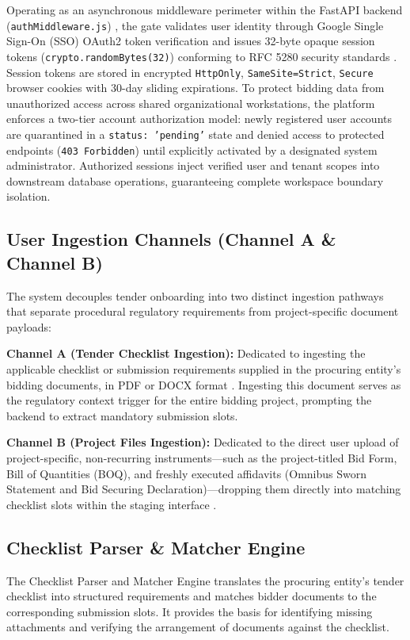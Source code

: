 Operating as an asynchronous middleware perimeter within the FastAPI backend (\texttt{authMiddleware.js}) \cite{ref54}, the gate validates user identity through Google Single Sign-On (SSO) OAuth2 token verification and issues 32-byte opaque session tokens (\texttt{crypto.randomBytes(32)}) conforming to RFC 5280 security standards \cite{ref41}.
Session tokens are stored in encrypted \texttt{HttpOnly}, \texttt{SameSite=Strict}, \texttt{Secure} browser cookies with 30-day sliding expirations.
To protect bidding data from unauthorized access across shared organizational workstations, the platform enforces a two-tier account authorization model: newly registered user accounts are quarantined in a \texttt{status: 'pending'} state and denied access to protected endpoints (\texttt{403 Forbidden}) until explicitly activated by a designated system administrator.
Authorized sessions inject verified user and tenant scopes into downstream database operations, guaranteeing complete workspace boundary isolation.

\subsection{User Ingestion Channels (Channel A \& Channel B)}
\label{sec:ingestion_channels}
The system decouples tender onboarding into two distinct ingestion pathways that separate procedural regulatory requirements from project-specific document payloads:

\textbf{Channel A (Tender Checklist Ingestion):} Dedicated to ingesting the applicable checklist or submission requirements supplied in the procuring entity's bidding documents, in PDF or DOCX format \cite{ref46}.
Ingesting this document serves as the regulatory context trigger for the entire bidding project, prompting the backend to extract mandatory submission slots.

\textbf{Channel B (Project Files Ingestion):} Dedicated to the direct user upload of project-specific, non-recurring instruments---such as the project-titled Bid Form, Bill of Quantities (BOQ), and freshly executed affidavits (Omnibus Sworn Statement and Bid Securing Declaration)---dropping them directly into matching checklist slots within the staging interface \cite{ref12}.

\subsection{Checklist Parser \& Matcher Engine}
\label{sec:checklist_parser}
The Checklist Parser and Matcher Engine translates the procuring entity's tender checklist into structured requirements and matches bidder documents to the corresponding submission slots. It provides the basis for identifying missing attachments and verifying the arrangement of documents against the checklist.


